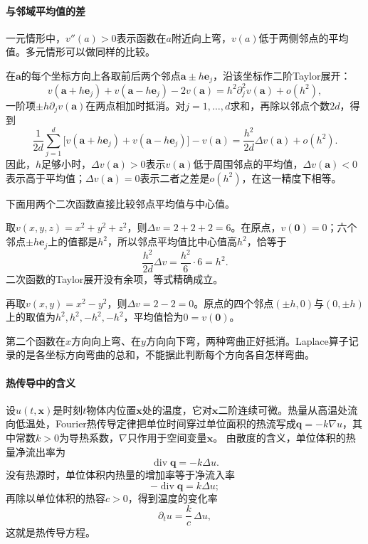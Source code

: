 \paragraph{与邻域平均值的差}

一元情形中，$v''(a)>0$表示函数在$a$附近向上弯，$v(a)$低于两侧邻点的平均值。多元情形可以做同样的比较。

在$\bm a$的每个坐标方向上各取前后两个邻点$\bm a\pm h\bm e_j$，沿该坐标作二阶Taylor展开：
\[
 v(\bm a+h\bm e_j)+v(\bm a-h\bm e_j)-2v(\bm a)=h^2\partial_j^2v(\bm a)+o(h^2),
\]
一阶项$\pm h\partial_jv(\bm a)$在两点相加时抵消。对$j=1,\ldots,d$求和，再除以邻点个数$2d$，得到
\[
 \frac1{2d}\sum_{j=1}^d\bigl[v(\bm a+h\bm e_j)+v(\bm a-h\bm e_j)\bigr]-v(\bm a)
 =\frac{h^2}{2d}\Delta v(\bm a)+o(h^2).
\]
因此，$h$足够小时，$\Delta v(\bm a)>0$表示$v(\bm a)$低于周围邻点的平均值，$\Delta v(\bm a)<0$表示高于平均值；$\Delta v(\bm a)=0$表示二者之差是$o(h^2)$，在这一精度下相等。

下面用两个二次函数直接比较邻点平均值与中心值。
\begin{example}[二次函数的邻点平均]
取$v(x,y,z)=x^2+y^2+z^2$，则$\Delta v=2+2+2=6$。在原点，$v(\bm0)=0$；六个邻点$\pm h\bm e_j$上的值都是$h^2$，所以邻点平均值比中心值高$h^2$，恰等于
\[
 \frac{h^2}{2d}\Delta v=\frac{h^2}6\cdot6=h^2.
\]
二次函数的Taylor展开没有余项，等式精确成立。

再取$v(x,y)=x^2-y^2$，则$\Delta v=2-2=0$。原点的四个邻点$(\pm h,0)$与$(0,\pm h)$上的取值为$h^2,h^2,-h^2,-h^2$，平均值恰为$0=v(\bm0)$。
\end{example}
第二个函数在$x$方向向上弯、在$y$方向向下弯，两种弯曲正好抵消。Laplace算子记录的是各坐标方向弯曲的总和，不能据此判断每个方向各自怎样弯曲。

\paragraph{热传导中的含义}

设$u(t,\bm x)$是时刻$t$物体内位置$\bm x$处的温度，它对$\bm x$二阶连续可微。热量从高温处流向低温处，Fourier热传导定律把单位时间穿过单位面积的热流写成$\bm q=-k\nabla u$，其中常数$k>0$为导热系数，$\nabla$只作用于空间变量$\bm x$。
由散度的含义，单位体积的热量净流出率为
\[
 \operatorname{div}\bm q=-k\Delta u.
\]
没有热源时，单位体积内热量的增加率等于净流入率
\[
 -\operatorname{div}\bm q=k\Delta u;
\]
再除以单位体积的热容$c>0$，得到温度的变化率
\begin{equation}
 \partial_tu=\frac kc\,\Delta u,
 \label{eq:multivariable-heat-equation}
\end{equation}
这就是热传导方程。

